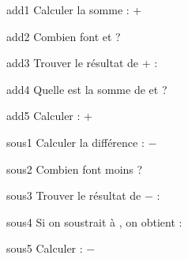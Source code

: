 \documentclass{article}
\begin{document}
\begin{question}{add1}
  Calculer la somme : \vAa{} + \vAb{}
  \begin{reponses}\bonne{\rA}\mauvaise{\eAa}\mauvaise{\eAb}\end{reponses}
\end{question}
\begin{question}{add2}
  Combien font \vBa{} et \vBb{} ?
  \begin{reponses}\bonne{\rB}\mauvaise{\eBa}\mauvaise{\eBb}\end{reponses}
\end{question}
\begin{question}{add3}
  Trouver le résultat de \vCa{} + \vCb{} :
  \begin{reponses}\bonne{\rC}\mauvaise{\eCa}\mauvaise{\eCb}\end{reponses}
\end{question}
\begin{question}{add4}
  Quelle est la somme de \vDa{} et \vDb{} ?
  \begin{reponses}\bonne{\rD}\mauvaise{\eDa}\mauvaise{\eDb}\end{reponses}
\end{question}
\begin{question}{add5}
  Calculer : \vEa{} + \vEb{}
  \begin{reponses}\bonne{\rE}\mauvaise{\eEa}\mauvaise{\eEb}\end{reponses}
\end{question}

\begin{question}{sous1}
  Calculer la différence : \vFa{} $-$ \vFb{}
  \begin{reponses}\bonne{\rF}\mauvaise{\eFa}\mauvaise{\eFb}\end{reponses}
\end{question}
\begin{question}{sous2}
  Combien font \vGa{} moins \vGb{} ?
  \begin{reponses}\bonne{\rG}\mauvaise{\eGa}\mauvaise{\eGb}\end{reponses}
\end{question}
\begin{question}{sous3}
  Trouver le résultat de \vHa{} $-$ \vHb{} :
  \begin{reponses}\bonne{\rH}\mauvaise{\eHa}\mauvaise{\eHb}\end{reponses}
\end{question}
\begin{question}{sous4}
  Si on soustrait \vIb{} à \vIa{}, on obtient :
  \begin{reponses}\bonne{\rI}\mauvaise{\eIa}\mauvaise{\eIb}\end{reponses}
\end{question}
\begin{question}{sous5}
  Calculer : \vJa{} $-$ \vJb{}
  \begin{reponses}\bonne{\rJ}\mauvaise{\eJa}\mauvaise{\eJb}\end{reponses}
\end{question}
\end{document}
